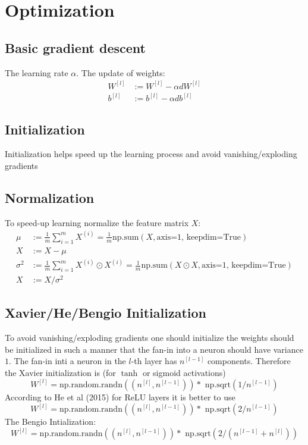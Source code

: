 \documentclass[10pt,a4paper]{article}
\begin{document}
 
\section{Optimization}

 
 \subsection{Basic gradient descent}

The learning rate $\alpha$.  
The update of weights:
\begin{align*}
W^{[l]}&:= W^{[l]} - \alpha  dW^{[l]}\\
b^{[l]}&:= b^{[l]} - \alpha  db^{[l]}
\end{align*}

\subsection{Initialization}
Initialization helps speed up the learning process and avoid vanishing/exploding gradients
\subsection{Normalization}
To speed-up learning normalize the feature matrix $X$:
\begin{align*}
\mu &:= \frac{1}{m}\sum_{i=1}^m  X^{(i)} =  \frac{1}{m}\text{np.sum}(X, \text{axis=1, keepdim=True})\\
X &:= X - \mu \\
\sigma^2 &:= \frac{1}{m}\sum_{i=1}^m  X^{(i)}\odot X^{(i)} =  \frac{1}{m}  \text{np.sum}(X\odot X, \text{axis=1, keepdim=True})\\
X &:= X/\sigma^2
\end{align*}
\subsection{Xavier/He/Bengio Initialization}
To avoid vanishing/exploding gradients one should initialize the weights should be initialized in such a manner that the fan-in
into a neuron should have variance $1$. The fan-in inti a neuron in the $l$-th layer has $n^{[l-1]}$ components. 
Therefore the Xavier initialization is (for $\tanh$ or sigmoid activations)
\[ W^[l] = \text{np.random.randn}((n^{[l]}, n^{[l-1]} )) * \text{ np.sqrt} (1 /  n^{[l-1]}) \]
According to He et al (2015) for   ReLU layers it is better to use 
\[ W^[l] = \text{np.random.randn}((n^{[l]}, n^{[l-1]} )) *\text{ np.sqrt} ( 2 /  n^{[l-1]}) \]
The Bengio Intialization: 
\[ W^[l] = \text{np.random.randn}((n^{[l]}, n^{[l-1]} )) *  \text{ np.sqrt} (2 /( n^{[l-1]} + n^{[l]}) ) \]
\end{document}
